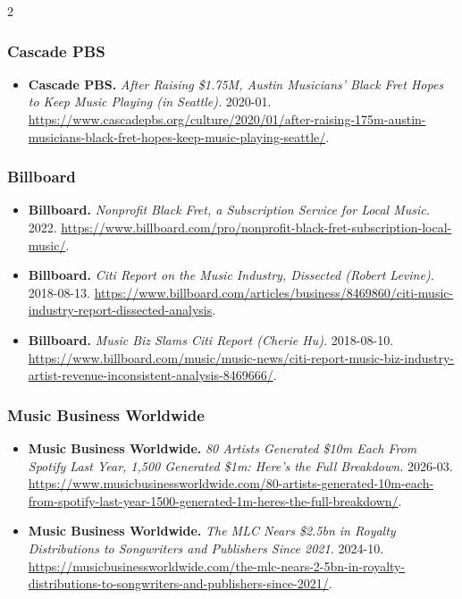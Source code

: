 {\begin{multicols}{2}
\subsubsection*{Cascade PBS}
\begin{itemize}[itemsep=0pt,topsep=1pt,parsep=0pt,partopsep=0pt,leftmargin=1em]
\item \textbf{Cascade PBS.} \textit{After Raising \$1.75M, Austin Musicians’ Black Fret Hopes to Keep Music Playing (in Seattle).} 2020-01. \url{https://www.cascadepbs.org/culture/2020/01/after-raising-175m-austin-musicians-black-fret-hopes-keep-music-playing-seattle/}.
\end{itemize}
\subsubsection*{Billboard}
\begin{itemize}[itemsep=0pt,topsep=1pt,parsep=0pt,partopsep=0pt,leftmargin=1em]
\item \textbf{Billboard.} \textit{Nonprofit Black Fret, a Subscription Service for Local Music.} 2022. \url{https://www.billboard.com/pro/nonprofit-black-fret-subscription-local-music/}.
\item \textbf{Billboard.} \textit{Citi Report on the Music Industry, Dissected (Robert Levine).} 2018-08-13. \url{https://www.billboard.com/articles/business/8469860/citi-music-industry-report-dissected-analysis}.
\item \textbf{Billboard.} \textit{Music Biz Slams Citi Report (Cherie Hu).} 2018-08-10. \url{https://www.billboard.com/music/music-news/citi-report-music-biz-industry-artist-revenue-inconsistent-analysis-8469666/}.
\end{itemize}
\subsubsection*{Music Business Worldwide}
\begin{itemize}[itemsep=0pt,topsep=1pt,parsep=0pt,partopsep=0pt,leftmargin=1em]
\item \textbf{Music Business Worldwide.} \textit{80 Artists Generated \$10m Each From Spotify Last Year, 1,500 Generated \$1m: Here’s the Full Breakdown.} 2026-03. \url{https://www.musicbusinessworldwide.com/80-artists-generated-10m-each-from-spotify-last-year-1500-generated-1m-heres-the-full-breakdown/}.
\item \textbf{Music Business Worldwide.} \textit{The MLC Nears \$2.5bn in Royalty Distributions to Songwriters and Publishers Since 2021.} 2024-10. \url{https://musicbusinessworldwide.com/the-mlc-nears-2-5bn-in-royalty-distributions-to-songwriters-and-publishers-since-2021/}.
\end{itemize}

\end{multicols}}
